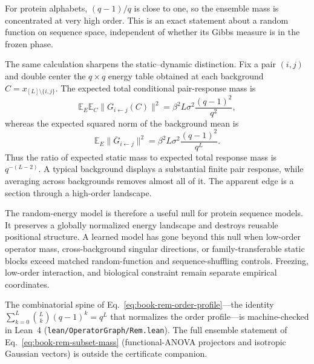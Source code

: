 For protein alphabets, $(q-1)/q$ is close to one, so the ensemble mass is concentrated at very
high order.  This is an exact statement about a random function on sequence space, independent of
whether its Gibbs measure is in the frozen phase.

The same calculation sharpens the static--dynamic distinction.  Fix a pair $(i,j)$ and double
center the $q\times q$ energy table obtained at each background
$C=x_{[L]\setminus\{i,j\}}$.  The expected
total conditional pair-response mass is
\begin{equation}
\mathbb E_E\mathbb E_C\|G_{i\leftarrow j}(C)\|^2
=\beta^2L\sigma^2\frac{(q-1)^2}{q^2},
\label{eq:book-rem-local-response}
\end{equation}
whereas the expected squared norm of the background mean is
\begin{equation}
\mathbb E_E\|\overline G_{i\leftarrow j}\|^2
=\beta^2L\sigma^2\frac{(q-1)^2}{q^L}.
\label{eq:book-rem-static-response}
\end{equation}
Thus the ratio of expected static mass to expected total response mass is $q^{-(L-2)}$.  A typical background displays a substantial
finite pair response, while averaging across backgrounds removes almost all of it.  The apparent
edge is a section through a high-order landscape.

The random-energy model is therefore a useful null for protein sequence models.  It preserves a
globally normalized energy landscape and destroys reusable positional structure.  A learned model
has gone beyond this null when low-order operator mass, cross-background singular directions, or
family-transferable static blocks exceed matched random-function and sequence-shuffling controls.
Freezing, low-order interaction, and biological constraint remain separate empirical coordinates.

The combinatorial spine of Eq.~\ref{eq:book-rem-order-profile}---the identity
$\sum_{k=0}^{L}\binom{L}{k}(q-1)^k = q^L$ that normalizes the order
profile---is machine-checked in Lean~4
(\texttt{lean/OperatorGraph/Rem.lean}).  The full ensemble statement of
Eq.~\ref{eq:book-rem-subset-mass} (functional-ANOVA projectors and isotropic
Gaussian vectors) is outside the certificate companion.
